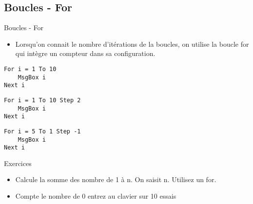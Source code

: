 \documentclass[aspectratio=169,usenames,dvipsnames]{beamer}
\begin{document}
    \subsection{Boucles - For}
    \begin{frame}[fragile]{Boucles - For}
        \begin{itemize}
            \item Lorsqu’on connait le nombre d’itérations de la boucles, on utilise la boucle for qui intègre un compteur dans sa configuration.
        \end{itemize}
\noindent\begin{minipage}{.25\textwidth}
\begin{lstlisting}
For i = 1 To 10
    MsgBox i
Next i
\end{lstlisting}
\end{minipage}\hfill
\begin{minipage}{.32\textwidth}
\begin{lstlisting}
For i = 1 To 10 Step 2
    MsgBox i
Next i
\end{lstlisting}
\end{minipage}\hfill
\begin{minipage}{.32\textwidth}
\begin{lstlisting}
For i = 5 To 1 Step -1
    MsgBox i
Next i
\end{lstlisting}
\end{minipage}
    \end{frame}
    \begin{frame}{Exercices}
        \begin{itemize}
            \item Calcule la somme des nombre de 1 à n. On saisit n. Utilisez un for.
            \item Compte le nombre de 0 entrez au clavier sur 10 essais
\end{itemize}
    \end{frame}
\end{document}

